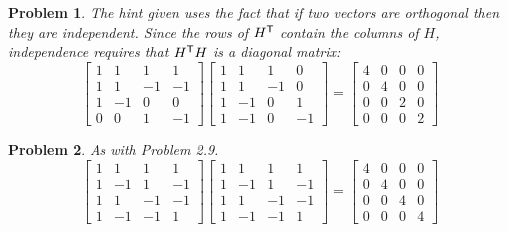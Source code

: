 \documentclass{article}
\theoremstyle{pprop}
\newtheorem{problem}{Problem}[section]
\begin{document}
\begin{problem}
The hint given uses the fact that if two vectors are orthogonal then they are independent. Since the rows of $H^{\sf T}$ contain the 
columns of $H$, independence requires that $H^{\sf T}H$ is a diagonal matrix:  
$$
\begin{bmatrix}
1 & 1 & 1 & 1 \\
1 & 1 & -1 & -1 \\
1 & -1 & 0 & 0 \\
0 & 0 & 1 & -1
\end{bmatrix}
\begin{bmatrix}
1 & 1 & 1 & 0 \\
1 & 1 & -1 & 0 \\
1 & -1 & 0 & 1 \\
1 & -1 & 0 & -1
\end{bmatrix}=
\begin{bmatrix}
4 & 0 & 0 & 0 \\
0 & 4 & 0 & 0 \\
0 & 0 & 2 & 0 \\
0 & 0 & 0 & 2
\end{bmatrix}
$$ 
\end{problem}
\begin{problem}
As with Problem 2.9.
$$
\begin{bmatrix}
1 & 1 & 1 & 1 \\
1 & -1 & 1 & -1 \\
1 & 1 & -1 & -1 \\
1 & -1 & -1 & 1
\end{bmatrix}
\begin{bmatrix}
1 & 1 & 1 & 1 \\
1 & -1 & 1 & -1 \\
1 & 1 & -1 & -1 \\
1 & -1 & -1 & 1
\end{bmatrix}=
\begin{bmatrix}
4 & 0 & 0 & 0 \\
0 & 4 & 0 & 0 \\
0 & 0 & 4 & 0 \\
0 & 0 & 0 & 4
\end{bmatrix}
$$  
\end{problem}
\end{document}
